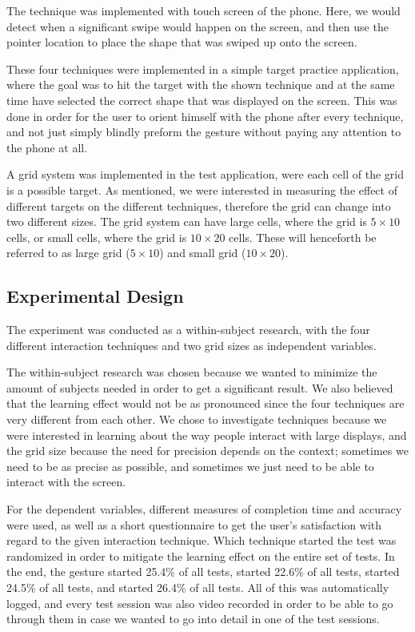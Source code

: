 The \swipe technique was implemented with touch screen of the phone. 
Here, we would detect when a significant swipe would happen on the screen, and then use the pointer location to place the shape that was swiped up onto the screen. 

These four techniques were implemented in a simple target practice application, where the goal was to hit the target with the shown technique and at the same time have selected the correct shape that was displayed on the screen. 
This was done in order for the user to orient himself with the phone after every technique, and not just simply blindly preform the gesture without paying any attention to the phone at all.  

A grid system was implemented in the test application, were each cell of the grid is a possible target. 
As mentioned, we were interested in measuring the effect of different targets on the different techniques, therefore the grid can change into two different sizes. 
The grid system can have large cells, where the grid is $5 \times 10$ cells, or small cells, where the grid is $10 \times 20$ cells. 
These will henceforth be referred to as large grid ($5 \times 10$) and small grid ($10 \times 20$). 

\subsection{Experimental Design}\label{sec:expdesign}
The experiment was conducted as a within-subject research, with the four different interaction techniques and two grid sizes as independent variables. 

The within-subject research was chosen because we wanted to minimize the amount of subjects needed in order to get a significant result. We also believed that the learning effect would not be as pronounced since the four techniques are very different from each other. 
We chose to investigate techniques because we were interested in learning about the way people interact with large displays, and the grid size because the need for precision depends on the context; sometimes we need to be as precise as possible, and sometimes we just need to be able to interact with the screen. 

For the dependent variables, different measures of completion time and accuracy were used, as well as a short questionnaire to get the user's satisfaction with regard to the given interaction technique. 
Which technique started the test was randomized in order to mitigate the learning effect on the entire set of tests. 
In the end, the \pinch gesture started 25.4\% of all tests, \swipe started 22.6\% of all tests, \throw started 24.5\% of all tests, and \tilt started 26.4\% of all tests. 
All of this was automatically logged, and every test session was also video recorded in order to be able to go through them in case we wanted to go into detail in one of the test sessions.

